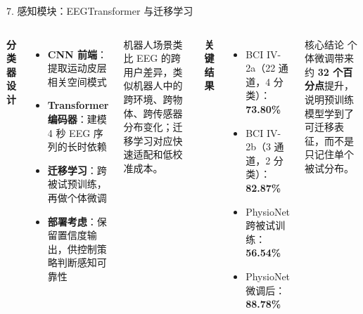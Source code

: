 \documentclass[UTF8,aspectratio=169,11pt]{ctexbeamer}
\begin{document}
\begin{frame}[shrink=8]{7. 感知模块：EEGTransformer 与迁移学习}

    \begin{columns}[T]
        \textbf{分类器设计}
        \begin{itemize}
            \item \textbf{CNN 前端}：提取运动皮层相关空间模式
            \item \textbf{Transformer 编码器}：建模 4 秒 EEG 序列的长时依赖
            \item \textbf{迁移学习}：跨被试预训练，再做个体微调
            \item \textbf{部署考虑}：保留置信度输出，供控制策略判断感知可靠性
        \end{itemize}

        \vspace{2mm}
        \begin{exampleblock}{机器人场景类比}
            EEG 的跨用户差异，类似机器人中的跨环境、跨物体、跨传感器分布变化；迁移学习对应快速适配和低校准成本。
        \end{exampleblock}

        \textbf{关键结果}
        \begin{itemize}
            \item BCI IV-2a（22 通道，4 分类）：\textbf{73.80\%}
            \item BCI IV-2b（3 通道，2 分类）：\textbf{82.87\%}
            \item PhysioNet 跨被试训练：\textbf{56.54\%}
            \item PhysioNet 微调后：\textbf{88.78\%}
        \end{itemize}

        \vspace{2mm}
        \begin{alertblock}{核心结论}
            个体微调带来约 \textbf{32 个百分点}提升，说明预训练模型学到了可迁移表征，而不是只记住单个被试分布。
        \end{alertblock}
    \end{columns}
\end{frame}
\end{document}
